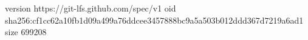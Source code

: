version https://git-lfs.github.com/spec/v1
oid sha256:cf1cc62a10fb1d09a499a76ddcee3457888bc9a5a503b012ddd367d7219a6ad1
size 699208
